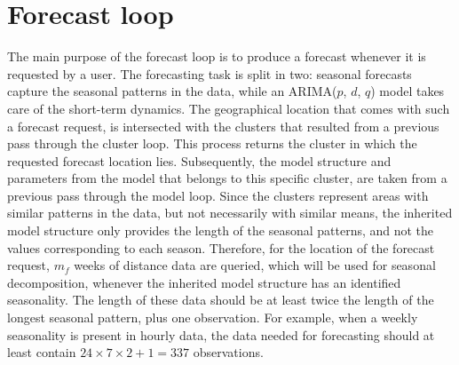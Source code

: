 \documentclass[12pt,oneside]{reedthesis}
\begin{document}
\section{Forecast loop}\label{forecast-loop}

The main purpose of the forecast loop is to produce a forecast whenever
it is requested by a user. The forecasting task is split in two:
seasonal forecasts capture the seasonal patterns in the data, while an
ARIMA(\(p\), \(d\), \(q\)) model takes care of the short-term dynamics.
The geographical location that comes with such a forecast request, is
intersected with the clusters that resulted from a previous pass through
the cluster loop. This process returns the cluster in which the
requested forecast location lies. Subsequently, the model structure and
parameters from the model that belongs to this specific cluster, are
taken from a previous pass through the model loop. Since the clusters
represent areas with similar patterns in the data, but not necessarily
with similar means, the inherited model structure only provides the
length of the seasonal patterns, and not the values corresponding to
each season. Therefore, for the location of the forecast request,
\(m_{f}\) weeks of distance data are queried, which will be used for
seasonal decomposition, whenever the inherited model structure has an
identified seasonality. The length of these data should be at least
twice the length of the longest seasonal pattern, plus one observation.
For example, when a weekly seasonality is present in hourly data, the
data needed for forecasting should at least contain
\(24 \times 7 \times 2 + 1 = 337\) observations.
\end{document}
